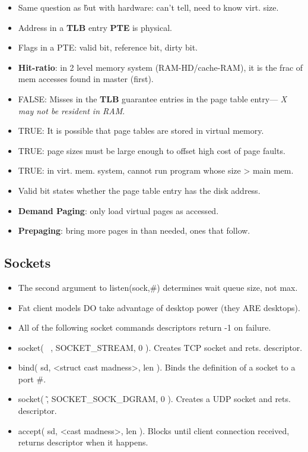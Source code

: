 \documentclass[fontsize=4.5pt]{scrartcl}
\begin{document}
\begin{multicols}{3}
\begin{itemize}
        \item Same question as \^ but with hardware: can't tell, need to know virt. size.
        \item Address in a \textbf{TLB} entry \textbf{PTE} is physical.
        \item Flags in a PTE: valid bit, reference bit, dirty bit.
        \item \textbf{Hit-ratio}: in 2 level memory system (RAM-HD/cache-RAM), it is the frac of mem accesses found in master (first).
        \item FALSE: Misses in the \textbf{TLB} guarantee entries in the page table entry--- \textit{X may not be resident in RAM}.
        \item TRUE: It is possible that page tables are stored in virtual memory.
        \item TRUE: page sizes must be large enough to offset high cost of page faults.
        \item TRUE: in virt. mem. system, cannot run program whose size > main mem.
        \item Valid bit states whether the page table entry has the disk address.
        \item \textbf{Demand Paging}: only load virtual pages as accessed.
        \item \textbf{Prepaging}: bring more pages in than needed, ones that follow.
      \end{itemize}

    \subsection{Sockets}
      \begin{itemize}
        \item The second argument to listen(sock,\#) determines wait queue size, not max.
        \item Fat client models DO take advantage of desktop power (they ARE desktops).
        \item All of the following socket commands descriptors return -1 on failure.
        \item socket( ~, SOCKET\_STREAM, 0 ). Creates TCP socket and rets. descriptor.
        \item bind( sd, <struct cast madness>, len ). Binds the definition of a socket to a port \#.
        \item socket( \~, SOCKET\_SOCK\_DGRAM, 0 ). Creates a UDP socket and rets. descriptor.
        \item accept( sd, <cast madness>, len ). Blocks until client connection received, returns descriptor when it happens.
      \end{itemize}
    

\end{multicols}
\end{document}
